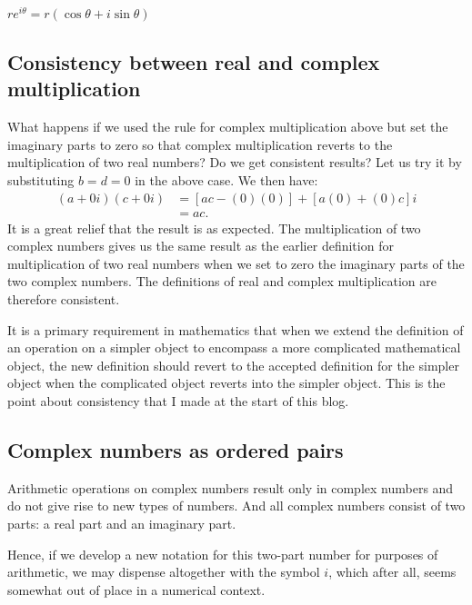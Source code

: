 \documentclass[
  a4paper,
]{article}
\begin{document}
\(re^{i\theta} = r(\cos\theta + i\sin\theta)\)

\hypertarget{consistency-between-real-and-complex-multiplication}{%
\subsection{Consistency between real and complex
multiplication}\label{consistency-between-real-and-complex-multiplication}}

What happens if we used the rule for complex multiplication above but
set the imaginary parts to zero so that complex multiplication reverts
to the multiplication of two real numbers? Do we get consistent results?
Let us try it by substituting \(b = d = 0\) in the above case. We then
have: \[
\begin{aligned}
(a + 0i)(c + 0i) & = [ac - (0)(0)] + [a(0) + (0)c]i\\
& = ac.
\end{aligned}
\] It is a great relief that the result is as expected. The
multiplication of two complex numbers gives us the same result as the
earlier definition for multiplication of two real numbers when we set to
zero the imaginary parts of the two complex numbers. The definitions of
real and complex multiplication are therefore consistent.

It is a primary requirement in mathematics that when we extend the
definition of an operation on a simpler object to encompass a more
complicated mathematical object, the new definition should revert to the
accepted definition for the simpler object when the complicated object
reverts into the simpler object. This is the point about consistency
that I made at the start of this blog.

\hypertarget{complex-numbers-as-ordered-pairs}{%
\subsection{Complex numbers as ordered
pairs}\label{complex-numbers-as-ordered-pairs}}

Arithmetic operations on complex numbers result only in complex numbers
and do not give rise to new types of numbers. And all complex numbers
consist of two parts: a real part and an imaginary part.

Hence, if we develop a new notation for this two-part number for
purposes of arithmetic, we may dispense altogether with the symbol
\(i\), which after all, seems somewhat out of place in a numerical
context.
\end{document}
